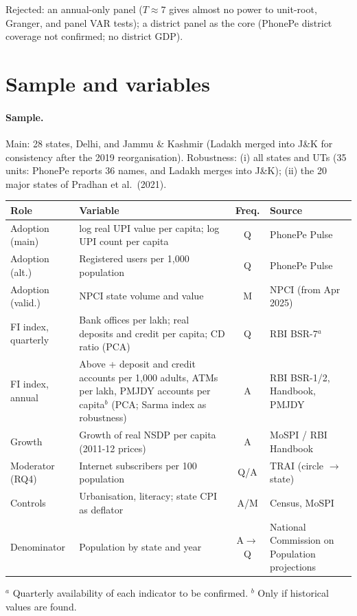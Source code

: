 \documentclass[11pt,a4paper]{article}
\begin{document}
Rejected: an annual-only panel ($T \approx 7$ gives almost no power to unit-root, Granger, and panel VAR
tests); a district panel as the core (PhonePe district coverage not confirmed; no district GDP).

\section{Sample and variables}

\paragraph{Sample.} Main: 28 states, Delhi, and Jammu \& Kashmir (Ladakh merged into J\&K for
consistency after the 2019 reorganisation). Robustness: (i) all states and UTs (35 units: PhonePe reports 36 names, and Ladakh merges into J\&K); (ii) the 20 major
states of Pradhan et al.\ (2021).

\begin{table}[h]
\centering\small
\begin{tabularx}{\textwidth}{@{}l Y c l@{}}
\toprule
Role & Variable & Freq. & Source \\
\midrule
Adoption (main) & log real UPI value per capita; log UPI count per capita & Q & PhonePe Pulse \\
Adoption (alt.) & Registered users per 1{,}000 population & Q & PhonePe Pulse \\
Adoption (valid.) & NPCI state volume and value & M & NPCI (from Apr 2025) \\
FI index, quarterly & Bank offices per lakh; real deposits and credit per capita; CD ratio (PCA)
  & Q & RBI BSR-7$^{a}$ \\
FI index, annual & Above + deposit and credit accounts per 1{,}000 adults, ATMs per lakh,
  PMJDY accounts per capita$^{b}$ (PCA; Sarma index as robustness) & A & RBI BSR-1/2, Handbook, PMJDY \\
Growth & Growth of real NSDP per capita (2011-12 prices) & A & MoSPI / RBI Handbook \\
Moderator (RQ4) & Internet subscribers per 100 population & Q/A & TRAI (circle $\to$ state) \\
Controls & Urbanisation, literacy; state CPI as deflator & A/M & Census, MoSPI \\
Denominator & Population by state and year & A$\to$Q & National Commission on Population projections \\
\bottomrule
\end{tabularx}
\par\smallskip\raggedright\footnotesize
$^{a}$ Quarterly availability of each indicator to be confirmed. $^{b}$ Only if historical values are found.
\end{table}
\end{document}
